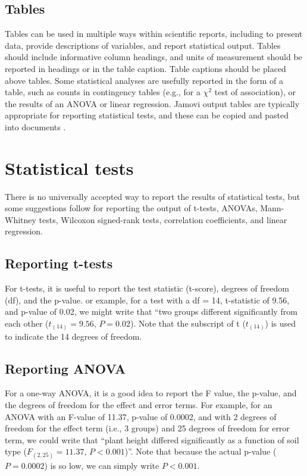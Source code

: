\documentclass[
]{scrbook}
\begin{document}
\hypertarget{tables}{%
\subsection{Tables}\label{tables}}

Tables can be used in multiple ways within scientific reports, including to present data, provide descriptions of variables, and report statistical output.
Tables should include informative column headings, and units of measurement should be reported in headings or in the table caption.
Table captions should be placed above tables.
Some statistical analyses are usefully reported in the form of a table, such as counts in contingency tables (e.g., for a \(\chi^{2}\) test of association), or the results of an ANOVA or linear regression.
Jamovi output tables are typically appropriate for reporting statistical tests, and these can be copied and pasted into documents \citep{Jamovi2022}.

\hypertarget{statistical-tests}{%
\section{Statistical tests}\label{statistical-tests}}

There is no universally accepted way to report the results of statistical tests, but some suggestions follow for reporting the output of t-tests, ANOVAs, Mann-Whitney tests, Wilcoxon signed-rank tests, correlation coefficients, and linear regression.

\hypertarget{reporting-t-tests}{%
\subsection{Reporting t-tests}\label{reporting-t-tests}}

For t-tests, it is useful to report the test statistic (t-score), degrees of freedom (df), and the p-value.
or example, for a test with a df = 14, t-statistic of 9.56, and p-value of 0.02, we might write that ``two groups different significantly from each other (\(t_{(14)} = 9.56\), \(P = 0.02\)).
Note that the subscript of t (\(t_{(14)}\)) is used to indicate the 14 degrees of freedom.

\hypertarget{reporting-anova}{%
\subsection{Reporting ANOVA}\label{reporting-anova}}

For a one-way ANOVA, it is a good idea to report the F value, the p-value, and the degrees of freedom for the effect and error terms.
For example, for an ANOVA with an F-value of 11.37, p-value of 0.0002, and with 2 degrees of freedom for the effect term (i.e., 3 groups) and 25 degrees of freedom for error term, we could write that ``plant height differed significantly as a function of soil type (\(F_{(2, 25)} = 11.37\), \(P < 0.001\))''.
Note that because the actual p-value (\(P = 0.0002\)) is so low, we can simply write \(P < 0.001\).
\end{document}
